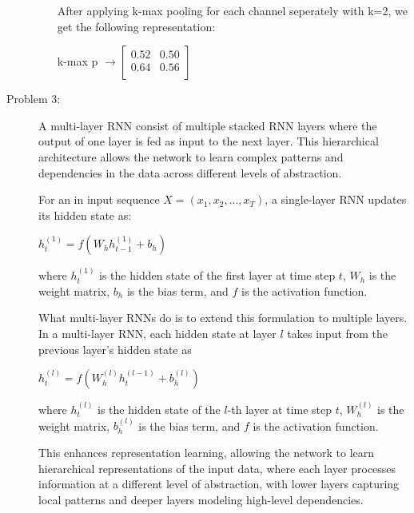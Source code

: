 \documentclass[10pt]{article}
\begin{document}
\begin{description}
\begin{enumerate}
        After applying k-max pooling for each channel seperately with k=2, we get the following representation:

        \begin{center}
            k-max p $\displaystyle{\rightarrow \begin{bmatrix} 0.52 & 0.50 \\  0.64 & 0.56 \\ \end{bmatrix}}$
        \end{center}

    \end{enumerate}

\pagebreak

\item[Problem 3:] \hfill %

A multi-layer RNN consist of multiple stacked RNN layers where the output of one layer is fed as input to the next layer.
This hierarchical architecture allows the network to learn complex patterns and dependencies in the data across different levels of abstraction.

For an in input sequence $X = (x_1, x_2, ..., x_T)$, a single-layer RNN updates its hidden state as:

\begin{center}
    $h_t^{(1)} = f(W_{h}h_{t-1}^{(1)} + b_h)$
\end{center}

where $h_t^{(1)}$ is the hidden state of the first layer at time step $t$, $W_{h}$ is the weight matrix, $b_h$ is the bias term, and $f$ is the activation function.

What multi-layer RNNs do is to extend this formulation to multiple layers. In a multi-layer RNN, each hidden state at layer $l$ takes input from the previous layer's hidden state as

\begin{center}
    $h_t^{(l)} = f(W_{h}^{(l)}h_t^{(l-1)} + b_h^{(l)})$
\end{center}

where $h_t^{(l)}$ is the hidden state of the $l$-th layer at time step $t$, $W_{h}^{(l)}$ is the weight matrix, $b_h^{(l)}$ is the bias term, and $f$ is the activation function.

This enhances representation learning, allowing the network to learn hierarchical representations of the input data, where each layer processes information at a different level of abstraction, with lower layers 
capturing local patterns and deeper layers modeling high-level dependencies.


\end{description}
\end{document}
